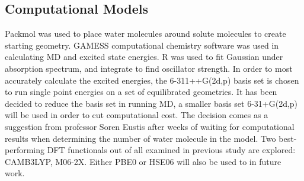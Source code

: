 \documentclass[
journal=jpcbfk, %
manuscript=article]{achemso}
\begin{document}
\subsection{Computational Models} 
Packmol was used to place water molecules around solute molecules to create starting geometry. GAMESS computational chemistry software was used in calculating MD and excited state energies. R was used to fit Gaussian under absorption spectrum, and integrate to find oscillator strength. In order to most accurately calculate the excited energies, the 6-311++G(2d,p) basis set is chosen to run single point energies on a set of equilibrated geometries. It has been decided to reduce the basis set in running MD, a smaller basis set 6-31+G(2d,p) will be used in order to cut computational cost. The decision comes as a suggestion from professor Soren Eustis after weeks of waiting for computational results when determining the number of water molecule in the model. Two best-performing DFT functionals out of all examined in previous study are explored: CAMB3LYP, M06-2X.\cite{Barnes2014} Either PBE0 or HSE06 will also be used to in future work.
\end{document}
